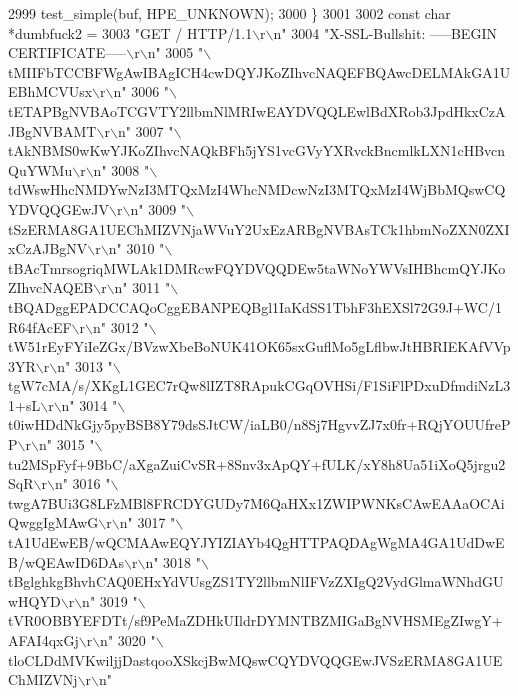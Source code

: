 \begin{DoxyCode}
{{{2999     test_simple(buf, HPE_UNKNOWN);
3000   \}
3001 
3002   \textcolor{keyword}{const} \textcolor{keywordtype}{char} *dumbfuck2 =
3003     \textcolor{stringliteral}{"GET / HTTP/1.1\(\backslash\)r\(\backslash\)n"}
3004     \textcolor{stringliteral}{"X-SSL-Bullshit:   -----BEGIN CERTIFICATE-----\(\backslash\)r\(\backslash\)n"}
3005     \textcolor{stringliteral}{"\(\backslash\)tMIIFbTCCBFWgAwIBAgICH4cwDQYJKoZIhvcNAQEFBQAwcDELMAkGA1UEBhMCVUsx\(\backslash\)r\(\backslash\)n"}
3006     \textcolor{stringliteral}{"\(\backslash\)tETAPBgNVBAoTCGVTY2llbmNlMRIwEAYDVQQLEwlBdXRob3JpdHkxCzAJBgNVBAMT\(\backslash\)r\(\backslash\)n"}
3007     \textcolor{stringliteral}{"\(\backslash\)tAkNBMS0wKwYJKoZIhvcNAQkBFh5jYS1vcGVyYXRvckBncmlkLXN1cHBvcnQuYWMu\(\backslash\)r\(\backslash\)n"}
3008     \textcolor{stringliteral}{"\(\backslash\)tdWswHhcNMDYwNzI3MTQxMzI4WhcNMDcwNzI3MTQxMzI4WjBbMQswCQYDVQQGEwJV\(\backslash\)r\(\backslash\)n"}
3009     \textcolor{stringliteral}{"\(\backslash\)tSzERMA8GA1UEChMIZVNjaWVuY2UxEzARBgNVBAsTCk1hbmNoZXN0ZXIxCzAJBgNV\(\backslash\)r\(\backslash\)n"}
3010     \textcolor{stringliteral}{"\(\backslash\)tBAcTmrsogriqMWLAk1DMRcwFQYDVQQDEw5taWNoYWVsIHBhcmQYJKoZIhvcNAQEB\(\backslash\)r\(\backslash\)n"}
3011     \textcolor{stringliteral}{"\(\backslash\)tBQADggEPADCCAQoCggEBANPEQBgl1IaKdSS1TbhF3hEXSl72G9J+WC/1R64fAcEF\(\backslash\)r\(\backslash\)n"}
3012     \textcolor{stringliteral}{"\(\backslash\)tW51rEyFYiIeZGx/BVzwXbeBoNUK41OK65sxGuflMo5gLflbwJtHBRIEKAfVVp3YR\(\backslash\)r\(\backslash\)n"}
3013     \textcolor{stringliteral}{"\(\backslash\)tgW7cMA/s/XKgL1GEC7rQw8lIZT8RApukCGqOVHSi/F1SiFlPDxuDfmdiNzL31+sL\(\backslash\)r\(\backslash\)n"}
3014     \textcolor{stringliteral}{"\(\backslash\)t0iwHDdNkGjy5pyBSB8Y79dsSJtCW/iaLB0/n8Sj7HgvvZJ7x0fr+RQjYOUUfrePP\(\backslash\)r\(\backslash\)n"}
3015     \textcolor{stringliteral}{"\(\backslash\)tu2MSpFyf+9BbC/aXgaZuiCvSR+8Snv3xApQY+fULK/xY8h8Ua51iXoQ5jrgu2SqR\(\backslash\)r\(\backslash\)n"}
3016     \textcolor{stringliteral}{"\(\backslash\)twgA7BUi3G8LFzMBl8FRCDYGUDy7M6QaHXx1ZWIPWNKsCAwEAAaOCAiQwggIgMAwG\(\backslash\)r\(\backslash\)n"}
3017     \textcolor{stringliteral}{"\(\backslash\)tA1UdEwEB/wQCMAAwEQYJYIZIAYb4QgHTTPAQDAgWgMA4GA1UdDwEB/wQEAwID6DAs\(\backslash\)r\(\backslash\)n"}
3018     \textcolor{stringliteral}{"\(\backslash\)tBglghkgBhvhCAQ0EHxYdVUsgZS1TY2llbmNlIFVzZXIgQ2VydGlmaWNhdGUwHQYD\(\backslash\)r\(\backslash\)n"}
3019     \textcolor{stringliteral}{"\(\backslash\)tVR0OBBYEFDTt/sf9PeMaZDHkUIldrDYMNTBZMIGaBgNVHSMEgZIwgY+AFAI4qxGj\(\backslash\)r\(\backslash\)n"}
3020     \textcolor{stringliteral}{"\(\backslash\)tloCLDdMVKwiljjDastqooXSkcjBwMQswCQYDVQQGEwJVSzERMA8GA1UEChMIZVNj\(\backslash\)r\(\backslash\)n"}
}}}
\end{DoxyCode}
